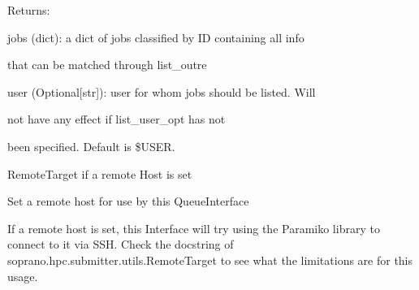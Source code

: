 \documentclass[letterpaper,10pt,english]{sphinxmanual}
\begin{document}
\begin{fulllineitems}
\begin{fulllineitems}
\begin{DUlineblock}{0em}
\item[] Returns:
\item[]
\begin{DUlineblock}{\DUlineblockindent}
\item[] jobs (dict): a dict of jobs classified by ID containing all info
\item[]
\begin{DUlineblock}{\DUlineblockindent}
\item[] that can be matched through list\_outre
\end{DUlineblock}
\item[] user (Optional{[}str{]}): user for whom jobs should be listed. Will
\item[]
\begin{DUlineblock}{\DUlineblockindent}
\item[] not have any effect if list\_user\_opt has not
\item[] been specified. Default is \$USER.
\item[] 
\end{DUlineblock}
\end{DUlineblock}
\end{DUlineblock}

\end{fulllineitems}


\begin{fulllineitems}
\label{doctree/soprano.hpc.submitter.queues:soprano.hpc.submitter.queues.QueueInterface.remote_target}
RemoteTarget if a remote Host is set

\end{fulllineitems}


\begin{fulllineitems}
\label{doctree/soprano.hpc.submitter.queues:soprano.hpc.submitter.queues.QueueInterface.set_remote_host}
Set a remote host for use by this QueueInterface

If a remote host is set, this Interface will try using the Paramiko
library to connect to it via SSH. Check the docstring of
soprano.hpc.submitter.utils.RemoteTarget to see what the limitations
are for this usage.


\end{fulllineitems}
\end{fulllineitems}
\end{document}
